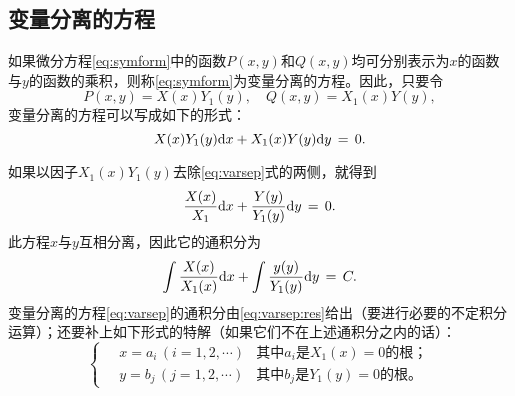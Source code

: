 \subsection{变量分离的方程}
如果微分方程\eqref{eq:symform}中的函数$P(x,y)$和$Q(x,y)$均可分别表示为$x$的函数与$y$的函数的乘积，则称\eqref{eq:symform}为{\heiti 变量分离的方程}。因此，只要令$$P(x,y)=X(x)Y_1(y),\quad Q(x,y)=X_1(x)Y(y),$$变量分离的方程可以写成如下的形式：
\begin{equation}\label{eq:varsep}
X(x)Y_1(y)\mathrm{d} x+X_1(x)Y(y)\mathrm{d} y\,=\,0.
\end{equation}\par
如果以因子$X_1(x)Y_1(y)$去除\eqref{eq:varsep}式的两侧，就得到$$\frac{X(x)}{X_1}\mathrm{d} x+\frac{Y(y)}{Y_1(y)}\mathrm{d} y\,=\,0.$$
此方程$x$与$y$互相分离，因此它的通积分为
\begin{equation}\label{eq:varsep:res}
\int\frac{X(x)}{X_1(x)}\mathrm{d} x+\int\frac{y(y)}{Y_1(y)}\mathrm{d} y\,=\,C.
\end{equation}
变量分离的方程\eqref{eq:varsep}的通积分由\eqref{eq:varsep:res}给出（要进行必要的不定积分运算）；还要补上如下形式的特解（如果它们不在上述通积分之内的话）：
\begin{equation*}
    \begin{cases}
        \quad x=a_i\,(i=1,2,\cdots) & \text{其中$a_i$是$X_1(x)=0$的根；} \\
        \quad y=b_j\,(j=1,2,\cdots) & \text{其中$b_j$是$Y_1(y)=0$的根。}
    \end{cases}
\end{equation*}

